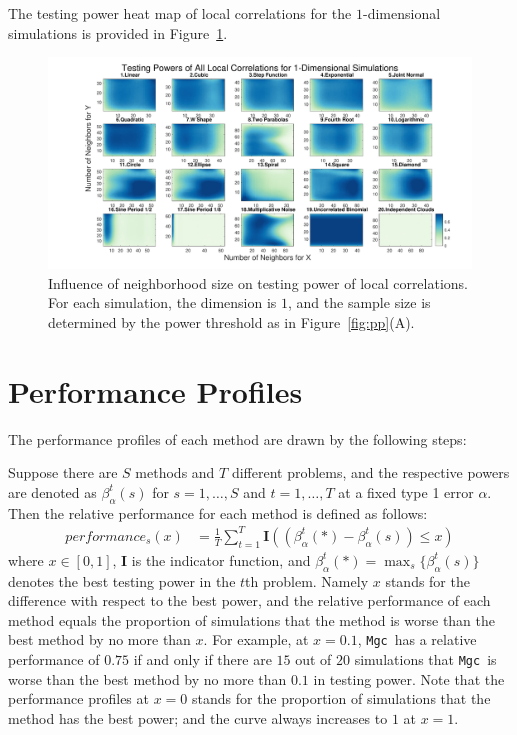 \documentclass[11pt]{article}
\providecommand{\sct}[1]{{\sc \texttt{#1}}}
\providecommand{\mb}[1]{\boldsymbol{#1}}
\newcommand{\Mgc}{\sct{Mgc}}
\begin{document}
The testing power heat map of local correlations for the $1$-dimensional simulations is provided in Figure~\ref{figSim2}.
\begin{figure}[htbp]
\includegraphics[width=1.0\textwidth]{Figures/Fig1DHeat}
\caption{Influence of neighborhood size on testing power of local correlations. For each simulation, the dimension is $1$, and the sample size is determined by the power threshold as in Figure~\ref{fig:pp}(A).
}
\label{figSim2}
\end{figure}

\section{Performance Profiles}
\label{appen:profiles}
The performance profiles of each method are drawn by the following steps:

Suppose there are $S$ methods and $T$ different problems, and the respective powers are denoted as $\beta_{\alpha}^{t}(s)$ for $s=1,\ldots,S$ and $t=1,\ldots,T$ at a fixed type 1 error $\alpha$. Then the relative performance for each method is defined as follows:
\begin{align*}
performance_{s}(x) &= \frac{1}{T} \sum_{t=1}^{T} \mb{I}((\beta_{\alpha}^{t}(*)-\beta_{\alpha}^{t}(s)) \leq x)
\end{align*}
where $x \in [0,1]$, $\mb{I}$ is the indicator function, and $\beta_{\alpha}^{t}(*) =\max_{s} \{\beta_{\alpha}^{t}(s)\}$ denotes the best testing power in the $t$th problem. Namely $x$ stands for the difference with respect to the best power, and the relative performance of each method equals the proportion of simulations that the method is worse than the best method by no more than $x$. For example, at $x=0.1$, \Mgc~has a relative performance of $0.75$ if and only if there are $15$ out of $20$ simulations that \Mgc~is worse than the best method by no more than $0.1$ in testing power. Note that the performance profiles at $x=0$ stands for the proportion of simulations that the method has the best power; and the curve always increases to $1$ at $x=1$. 
\end{document}
